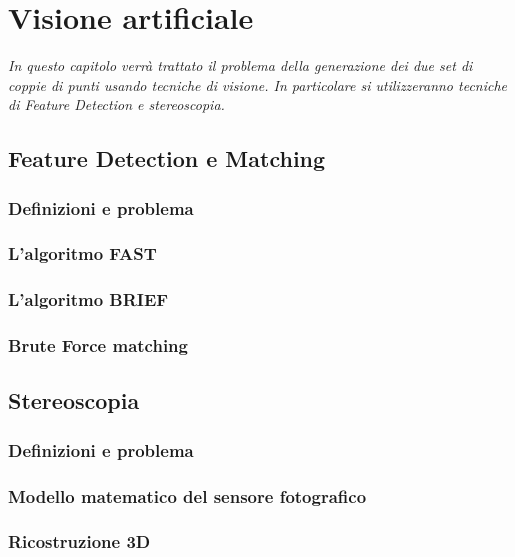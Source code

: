 \chapter{Visione artificiale}
\label{chap:visione}

\begin{minipage}{12cm}\textit{In questo capitolo verrà trattato il problema della generazione dei due set di coppie di punti usando tecniche di visione. In particolare si utilizzeranno tecniche di Feature Detection e stereoscopia.}
\end{minipage}

\vspace*{1cm}



\section{Feature Detection e Matching}
\label{sec:feature}

\subsection{Definizioni e problema}
\label{sec:det:def}


\subsection{L'algoritmo FAST}
\label{sec:det:fast}

\subsection{L'algoritmo BRIEF}
\label{sec:det:brief}

\subsection{Brute Force matching}
\label{sec:det:bmmatch}


\section{Stereoscopia}
\label{sec:stereo}


\subsection{Definizioni e problema}
\label{sec:stereo:def}


\subsection{Modello matematico del sensore fotografico}
\label{sec:stereo:modello}


\subsection{Ricostruzione 3D}
\label{sec:stereo:ric3d}





